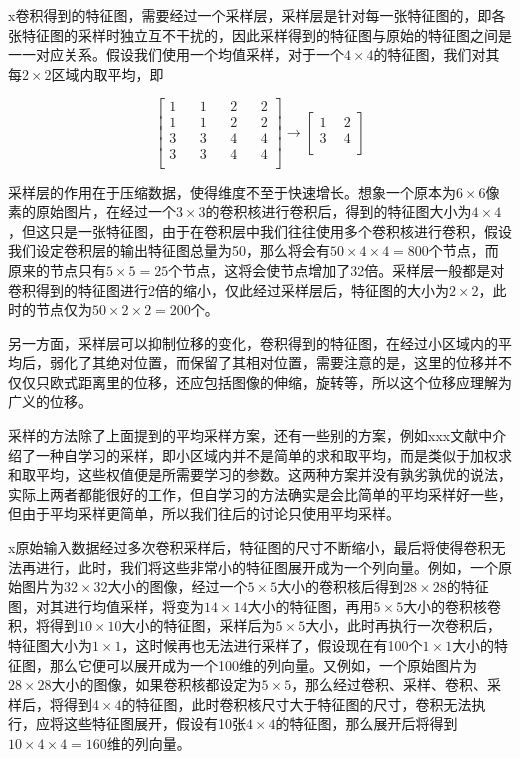 x卷积得到的特征图，需要经过一个采样层，采样层是针对每一张特征图的，即各张特征图的采样时独立互不干扰的，因此采样得到的特征图与原始的特征图之间是一一对应关系。假设我们使用一个均值采样，对于一个$4\times 4$的特征图，我们对其每$2\times 2$区域内取平均，即

\begin{equation}
\left[
\begin{array}{cccc}
1 &~~~~1 &~~~~2& ~~~~2\\
1 &~~~~1 &~~~~2& ~~~~2\\
3 &~~~~3 &~~~~4 &~~~~4\\
3 &~~~~3 &~~~~4 &~~~~4\\
\end{array}
\right] \rightarrow \left[
\begin{array}{cc}
1&~~2\\
3&~~4\\
\end{array}
\right]
\end{equation}

采样层的作用在于压缩数据，使得维度不至于快速增长。想象一个原本为$6\times 6$像素的原始图片，在经过一个$3\times 3$的卷积核进行卷积后，得到的特征图大小为$4\times 4$，但这只是一张特征图，由于在卷积层中我们往往使用多个卷积核进行卷积，假设我们设定卷积层的输出特征图总量为50，那么将会有$50\times 4 \times 4 = 800$个节点，而原来的节点只有$5\times 5 = 25$个节点，这将会使节点增加了32倍。采样层一般都是对卷积得到的特征图进行2倍的缩小，仅此经过采样层后，特征图的大小为$2\times 2$，此时的节点仅为$50\times 2 \times 2 = 200$个。

另一方面，采样层可以抑制位移的变化，卷积得到的特征图，在经过小区域内的平均后，弱化了其绝对位置，而保留了其相对位置，需要注意的是，这里的位移并不仅仅只欧式距离里的位移，还应包括图像的伸缩，旋转等，所以这个位移应理解为广义的位移。

采样的方法除了上面提到的平均采样方案，还有一些别的方案，例如xxx文献中介绍了一种自学习的采样，即小区域内并不是简单的求和取平均，而是类似于加权求和取平均，这些权值便是所需要学习的参数。这两种方案并没有孰劣孰优的说法，实际上两者都能很好的工作，但自学习的方法确实是会比简单的平均采样好一些，但由于平均采样更简单，所以我们往后的讨论只使用平均采样。

x原始输入数据经过多次卷积采样后，特征图的尺寸不断缩小，最后将使得卷积无法再进行，此时，我们将这些非常小的特征图展开成为一个列向量。例如，一个原始图片为$32\times 32$大小的图像，经过一个$5\times 5$大小的卷积核后得到$28\times 28$的特征图，对其进行均值采样，将变为$14\times 14$大小的特征图，再用$5\times 5$大小的卷积核卷积，将得到$10\times 10$大小的特征图，采样后为$5\times 5$大小，此时再执行一次卷积后，特征图大小为$1\times 1$，这时候再也无法进行采样了，假设现在有100个$1\times 1$大小的特征图，那么它便可以展开成为一个100维的列向量。又例如，一个原始图片为$28\times 28$大小的图像，如果卷积核都设定为$5\times 5$，那么经过卷积、采样、卷积、采样后，将得到$4\times 4$的特征图，此时卷积核尺寸大于特征图的尺寸，卷积无法执行，应将这些特征图展开，假设有10张$4\times 4$的特征图，那么展开后将得到$10 \times 4 \times 4 = 160$维的列向量。

